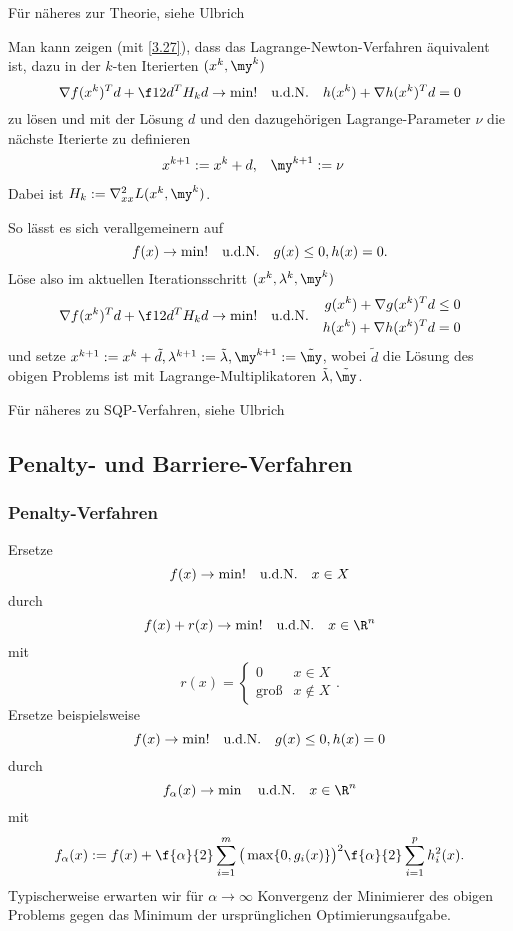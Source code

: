 Für näheres zur Theorie, siehe Ulbrich %

Man kann zeigen (mit \ref{3.27}), dass das Lagrange-Newton-Verfahren äquivalent ist, dazu in der $k$-ten Iterierten $(x^k, \my^k)$
\[
	\nabla f(x^k)^T d + \f 12 d^T H_k d \to\min!
	\udN h(x^k) + \nabla h(x^k)^T d = 0
\]
zu lösen und mit der Lösung $d$ und den dazugehörigen Lagrange-Parameter $\nu$ die nächste Iterierte zu definieren
\begin{align*}
	x^{k+1} &:= x^k + d, &
	\my^{k+1} &:= \nu
\end{align*}
Dabei ist $H_k := \nabla_{xx}^2 L(x^k, \my^k)$.

So lässt es sich verallgemeinern auf
\[
	f(x) \to \min! \quad\text{u.d.N.}\quad g(x) \le 0, h(x) = 0.
\]
Löse also im aktuellen Iterationsschritt $(x^k, \lambda^k, \my^k)$
\[
	\nabla f(x^k)^T d + \f 12 d^T H_k d \to \min!
	\udN
	\begin{aligned}
		g(x^k) + \nabla g(x^k)^T d & \le 0 \\
		h(x^k) + \nabla h(x^k)^T d & = 0
	\end{aligned}
\]
und setze $x^{k+1} := x^k + \tilde d, \lambda^{k+1} := \tilde \lambda, \my^{k+1} := \tilde \my$, wobei $\tilde d$ die Lösung des obigen Problems ist mit Lagrange-Multiplikatoren $\tilde \lambda, \tilde \my$.

Für näheres zu SQP-Verfahren, siehe Ulbrich %

\subsection{Penalty- und Barriere-Verfahren}

\subsubsection{Penalty-Verfahren}

Ersetze
\[
	f(x) \to \min! \quad\text{u.d.N.}\quad x\in X
\]
durch
\[
	f(x) + r(x) \to \min! \udN x \in \R^n
\]
mit
\[
	r(x) = \begin{cases}
		0 & x \in X \\
		\text{groß} & x \not\in X
	\end{cases}.
\]
Ersetze beispielsweise
\[
	f(x) \to \min! \quad\text{u.d.N.}\quad g(x) \le 0, h(x) = 0
\]
durch
\[
	f_\alpha(x) \to \min \udN x \in \R^n
\]
mit
\[
	f_\alpha(x) := f(x) + \f{\alpha}{2} \sum_{i=1}^m \big(\max \{ 0, g_i(x) \}\big)^2 \f{\alpha}{2} \sum_{i=1}^p h_i^2 (x).
\]
Typischerweise erwarten wir für $\alpha \to \infty$ Konvergenz der Minimierer des obigen Problems gegen das Minimum der ursprünglichen Optimierungsaufgabe.

